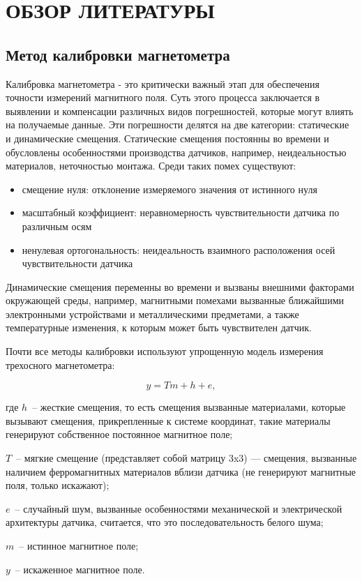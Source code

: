 \section{ОБЗОР ЛИТЕРАТУРЫ}
\label{sec:domain}


\subsection{Метод калибровки магнетометра}
Калибровка магнетометра - это критически важный этап для обеспечения точности измерений магнитного поля. 
Суть этого процесса заключается в выявлении и компенсации различных видов погрешностей, которые могут 
влиять на получаемые данные. Эти погрешности делятся на две категории: статические и динамические смещения.
Статические смещения постоянны во времени и обусловлены особенностями производства датчиков, например,
неидеальностью материалов, неточностью монтажа. Среди таких помех существуют: 
\begin{itemize}
    \item смещение нуля: отклонение измеряемого значения от истинного нуля
    \item масштабный коэффициент: неравномерность чувствительности датчика по различным осям
    \item ненулевая ортогональность: неидеальность взаимного расположения осей чувствительности датчика
\end{itemize}

Динамические смещения переменны во времени и вызваны внешними факторами окружающей среды, например, магнитными помехами
вызванные ближайшими электронными устройствами и металлическими предметами, 
а также температурные изменения, к которым может быть чувствителен датчик.

Почти все методы калибровки используют упрощенную модель измерения трехосного магнетометра:

\begin{equation}
    \label{eq:domain:magnetModel}
    y = Tm+h+e,
  \end{equation}
  \begin{explanationx}
    \item[где] $h$~-- жесткие смещения, то есть смещения вызванные материалами, которые вызывают смещения, прикрепленные к системе координат, такие материалы генерируют собственное  постоянное магнитное поле;
    \item      $T$~-- мягкие смещение (представляет собой матрицу 3x3) --- смещения, вызванные наличием ферромагнитных материалов вблизи датчика (не генерируют магнитные поля, только искажают);
    \item      $e$~-- случайный шум, вызванные особенностями механической и электрической архитектуры датчика, считается, что это последовательность белого шума;
    \item      $m$~-- истинное магнитное поле;
    \item      $y$~-- искаженное магнитное поле.
  \end{explanationx}

